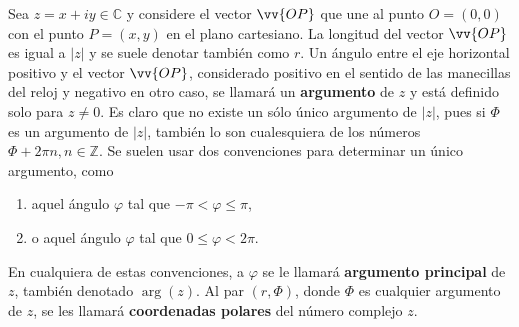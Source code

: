 

\begin{definition}
Sea $z = x + i y \in \mathbb{C}$ y considere el vector $\vv{OP}$ que une al punto $O = (0,0)$ con el punto $P = (x,y)$ en el plano cartesiano. La longitud del vector $\vv{OP}$ es igual a $|z|$ y se suele denotar también como $r$. Un ángulo entre el eje horizontal positivo y el vector $\vv{OP}$, considerado positivo en el sentido de las manecillas del reloj y negativo en otro caso, se llamará un \textbf{argumento} de $z$ y está definido solo para $z \ne 0$. Es claro que no existe un sólo único argumento de $|z|$, pues si $\Phi$ es un argumento de $|z|$, también lo son cualesquiera de los números $\Phi + 2 \pi n, n \in \mathbb{Z}$. Se suelen usar dos convenciones para determinar un único argumento, como
\begin{enumerate}[label=\textnormal{(\roman*)}]
\item aquel ángulo $\varphi$ tal que $-\pi < \varphi \le \pi$,
\item o aquel ángulo $\varphi$ tal que $0 \le \varphi < 2 \pi$.
\end{enumerate}

En cualquiera de estas convenciones, a $\varphi$ se le llamará \textbf{argumento principal} de $z$, también denotado $\arg(z)$. Al par $(r, \Phi)$, donde $\Phi$ es cualquier argumento de $z$, se les llamará \textbf{coordenadas polares} del número complejo $z$.
\end{definition}
